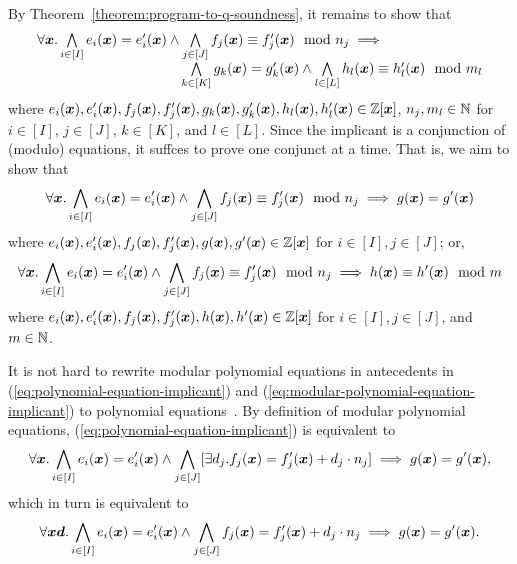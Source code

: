 
By Theorem~\ref{theorem:program-to-q-soundness}, it remains to show 
that 
\[
\begin{array}{l}
  \forall \vx. %
  \bigwedge\limits_{i \in [I]} e_i (\vx) = e'_i (\vx) \wedge
  \bigwedge\limits_{j \in [J]} f_j (\vx) \equiv f'_j (\vx) \mod n_j
  \implies
  \\
  \hspace{.3\textwidth}
  \bigwedge\limits_{k \in [K]} g_k (\vx) = g'_k (\vx) \wedge
  \bigwedge\limits_{l \in [L]} h_l (\vx) \equiv h'_l (\vx) \mod m_l
\end{array}
\]
where
$e_i (\vx), e'_i (\vx), f_j (\vx), f'_j (\vx),
 g_k (\vx), g'_k (\vx), h_l (\vx), h'_l (\vx) \in
 \bbfZ[\vx]$, $n_j, m_l \in \mathbb{N}$ for $i \in [I]$, $j \in [J]$, $k
 \in [K]$, and $l \in [L]$. Since the
implicant is a conjunction of (modulo) equations, it suffces to 
prove one conjunct at a time. That is, we aim to show that 
\begin{equation}
  \label{eq:polynomial-equation-implicant}
  \forall \vx. %
  \bigwedge\limits_{i \in [I]} e_i (\vx) = e'_i (\vx) \wedge
  \bigwedge\limits_{j \in [J]} f_j (\vx) \equiv f'_j (\vx) \mod n_j
  \implies
  g (\vx) = g' (\vx)
\end{equation}
where $e_i (\vx), e'_i (\vx), f_j (\vx), f'_j (\vx), g (\vx), g' (\vx)
\in \bbfZ[\vx]$ for $i \in [I], j \in [J]$; or, 
 \begin{equation}
   \label{eq:modular-polynomial-equation-implicant}
   \forall \vx. %
   \bigwedge\limits_{i \in [I]} e_i (\vx) = e'_i (\vx) \wedge
   \bigwedge\limits_{j \in [J]} f_j (\vx) \equiv f'_j (\vx) \mod n_j
   \implies
   h (\vx) \equiv h' (\vx) \mod m
 \end{equation}
where $e_i (\vx), e'_i (\vx), f_j (\vx), f'_j (\vx), h (\vx), h' (\vx)
\in \bbfZ[\vx]$ for $i \in [I], j \in [J]$, and $m \in \mathbb{N}$. 

It is not hard to rewrite modular polynomial equations in antecedents
in (\ref{eq:polynomial-equation-implicant}) and 
(\ref{eq:modular-polynomial-equation-implicant}) to polynomial
equations~\cite{H:07:AENTP}. By definition of modular polynomial equations,
(\ref{eq:polynomial-equation-implicant}) is equivalent to
\[
\forall \vx. %
\bigwedge\limits_{i \in [I]} e_i (\vx) = e'_i (\vx) \wedge
\bigwedge\limits_{j \in [J]} [\exists d_j. f_j (\vx) = f'_j (\vx) + d_j \cdot n_j]
\implies
g (\vx) = g' (\vx),
\]
which in turn is equivalent to
\[
\forall \vx \vd. %
\bigwedge\limits_{i \in [I]} e_i (\vx) = e'_i (\vx) \wedge
\bigwedge\limits_{j \in [J]} f_j (\vx) = f'_j (\vx) + d_j \cdot n_j
\implies
g (\vx) = g' (\vx).
\]

